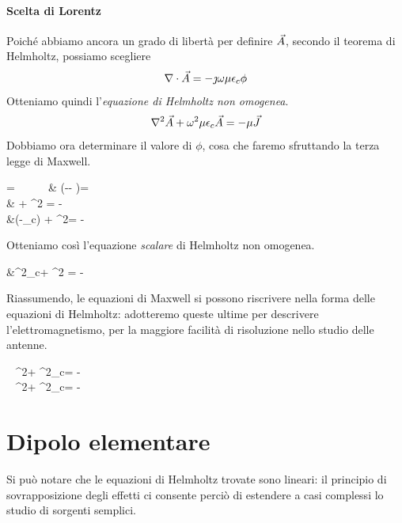 \paragraph{Scelta di Lorentz}
Poiché abbiamo ancora un grado di libertà per definire $\vec{A}$, secondo il teorema di Helmholtz, possiamo scegliere
\begin{equation}
	\nabla\cdot \vec{A} = -\jmath \omega \mu \epsilon_c \phi
\end{equation}
Otteniamo quindi l'\emph{equazione di Helmholtz non omogenea}.
\begin{equation}
	\nabla^2\vec{A} + \omega^2 \mu\epsilon_c\vec{A} =-\mu \vec{J}
\end{equation}
Dobbiamo ora determinare il valore di $\phi$, cosa che faremo sfruttando la terza legge di Maxwell.
\begin{esp*}
	\diverg\E
		= \frac{\rho}{\epsilon} ~~ \implies ~~ &
		\diverg\left(-\jmath \omega \A - \nabla \phi	 \right)= \frac{\rho}{\epsilon}\\
	 & \jmath \omega \nabla \A + \nabla^2 \phi= -\frac{\rho}{\epsilon}	 \\
	&\jmath\omega\left(-\jmath \omega\mu\epsilon_c\phi\right) + \nabla^2\phi = - \frac{\rho}{\epsilon}\\
\end{esp*}

Otteniamo così l'equazione \emph{scalare} di Helmholtz non omogenea.
\begin{esp*}
	&\omega^2\mu\epsilon_c\phi + \nabla^2 \phi = -\frac{\rho}{\epsilon}
\end{esp*}

Riassumendo, le equazioni di Maxwell si possono riscrivere nella forma delle equazioni di Helmholtz: adotteremo queste ultime per descrivere l'elettromagnetismo, per la maggiore facilità di risoluzione nello studio delle antenne.

\begin{esp}\label{eq:helmolts-lorentz}
	\begin{dcases}
		~ \nabla^2\A + \omega^2\mu\epsilon_c\A = -\mu\J \\
		~ \nabla^2\phi + \omega^2\mu\epsilon_c\phi = -\frac{\rho}{\epsilon}
	\end{dcases}
\end{esp}

\section{Dipolo elementare}
Si può notare che le equazioni di Helmholtz trovate sono lineari: il principio di sovrapposizione degli effetti ci consente perciò di estendere a casi complessi lo studio di sorgenti semplici.

